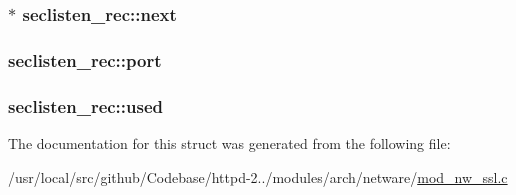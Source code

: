 \subsubsection[{\texorpdfstring{next}{next}}]{$\ast$ seclisten\+\_\+rec\+::next}\hypertarget{structseclisten__rec_a68a4427decde1a8200248d6810b15351}{}\label{structseclisten__rec_a68a4427decde1a8200248d6810b15351}
\subsubsection[{\texorpdfstring{port}{port}}]{ seclisten\+\_\+rec\+::port}\hypertarget{structseclisten__rec_ae1f3363fb6e7f7c5e5bc8eb036581abc}{}\label{structseclisten__rec_ae1f3363fb6e7f7c5e5bc8eb036581abc}
\subsubsection[{\texorpdfstring{used}{used}}]{ seclisten\+\_\+rec\+::used}\hypertarget{structseclisten__rec_aa0a7ecbaa4b26a5db632cf147199097d}{}\label{structseclisten__rec_aa0a7ecbaa4b26a5db632cf147199097d}


The documentation for this struct was generated from the following file\+:\begin{DoxyCompactItemize}
\item 
/usr/local/src/github/\+Codebase/httpd-\/2../modules/arch/netware/\hyperlink{mod__nw__ssl_8c}{mod\+\_\+nw\+\_\+ssl.\+c}\end{DoxyCompactItemize}
